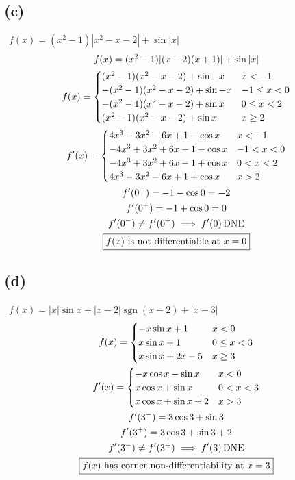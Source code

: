\documentclass[12pt]{article}
\newcommand{\subproblem}[1]{\subsection{(#1)} \,}
\DeclareMathOperator{\dne}{DNE}
\DeclareMathOperator{\sgn}{sgn}
\begin{document}
\subproblem{c} $f(x)=(x^2-1)|x^2-x-2|+\sin |x|$
\begin{gather*}
    f(x)=(x^2-1)|(x-2)(x+1)|+\sin |x|\\
    f(x)=\begin{cases}
        (x^2-1)(x^2-x-2)+\sin -x & x<-1\\
        -(x^2-1)(x^2-x-2)+\sin -x & -1 \le x<0\\
        -(x^2-1)(x^2-x-2)+\sin x & 0 \le x<2\\
        (x^2-1)(x^2-x-2)+\sin x & x \ge 2
    \end{cases}\\
    f'(x)=\begin{cases}
        4x^3-3x^2-6x+1- \cos x & x<-1\\
        -4x^3+3x^2+6x-1 -\cos x & -1 < x<0\\
        -4x^3+3x^2+6x-1+\cos x & 0 < x<2\\
        4x^3-3x^2-6x+1+\cos x & x > 2
    \end{cases}\\
    f'(0^-)=-1-\cos 0=-2\\
    f'(0^+)=-1+\cos 0 =0\\
    f'(0^-)\ne f'(0^+) \implies f'(0) \dne\\
    \boxed{f(x) $ is not differentiable at $ x=0}
\end{gather*}
 
\subproblem{d} $f(x)=|x|\sin x+|x-2| \sgn (x-2)+|x-3|$
\begin{gather*}
    f(x)=\begin{cases}
        -x \sin x+1 & x<0\\
        x \sin x+1 & 0 \le x <3\\
        x \sin x+2x-5 & x \ge 3
    \end{cases}\\
    f'(x)=\begin{cases}
        -x \cos x- \sin x & x<0\\
        x \cos x + \sin x & 0 < x <3\\
        x \cos x + \sin x+2 & x > 3
    \end{cases}\\
    f'(3^-)=3 \cos 3+ \sin 3\\
    f'(3^+)=3 \cos 3+ \sin 3 + 2\\
    f'(3^-) \ne f'(3^+) \implies f'(3) \dne\\
    \boxed{f(x) $ has corner non-differentiability at $ x=3}
\end{gather*}
\end{document}
